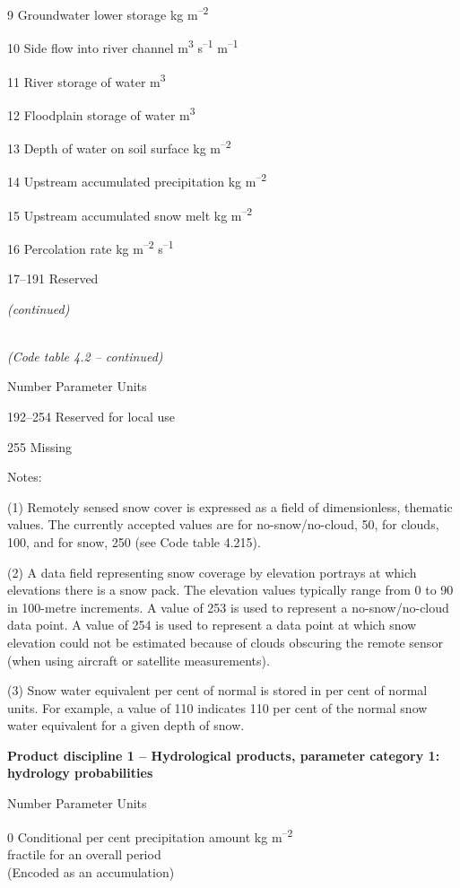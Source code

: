 9 Groundwater lower storage kg m\textsuperscript{--2}

10 Side flow into river channel m\textsuperscript{3} s\textsuperscript{--1} m\textsuperscript{--1}

11 River storage of water m\textsuperscript{3}

12 Floodplain storage of water m\textsuperscript{3}

13 Depth of water on soil surface kg m\textsuperscript{--2}

14 Upstream accumulated precipitation kg m\textsuperscript{--2}

15 Upstream accumulated snow melt kg m\textsuperscript{--2}

16 Percolation rate kg m\textsuperscript{--2} s\textsuperscript{--1}

17--191 Reserved

\emph{(continued)}

\emph{\\
(Code table 4.2 -- continued)}

Number Parameter Units

192--254 Reserved for local use

255 Missing

Notes:

(1) Remotely sensed snow cover is expressed as a field of dimensionless, thematic values. The currently accepted values are for no-snow/no-cloud, 50, for clouds, 100, and for snow, 250 (see Code table 4.215).

(2) A data field representing snow coverage by elevation portrays at which elevations there is a snow pack. The elevation values typically range from 0 to 90 in 100-metre increments. A value of 253 is used to represent a no-snow/no-cloud data point. A value of 254 is used to represent a data point at which snow elevation could not be estimated because of clouds obscuring the remote sensor (when using aircraft or satellite measurements).

(3) Snow water equivalent per cent of normal is stored in per cent of normal units. For example, a value of 110 indicates 110 per cent of the normal snow water equivalent for a given depth of snow.

\textbf{Product discipline 1 -- Hydrological products, parameter category 1: hydrology probabilities}

Number Parameter Units

0 Conditional per cent precipitation amount kg m\textsuperscript{--2}\\
fractile for an overall period\\
(Encoded as an accumulation)

